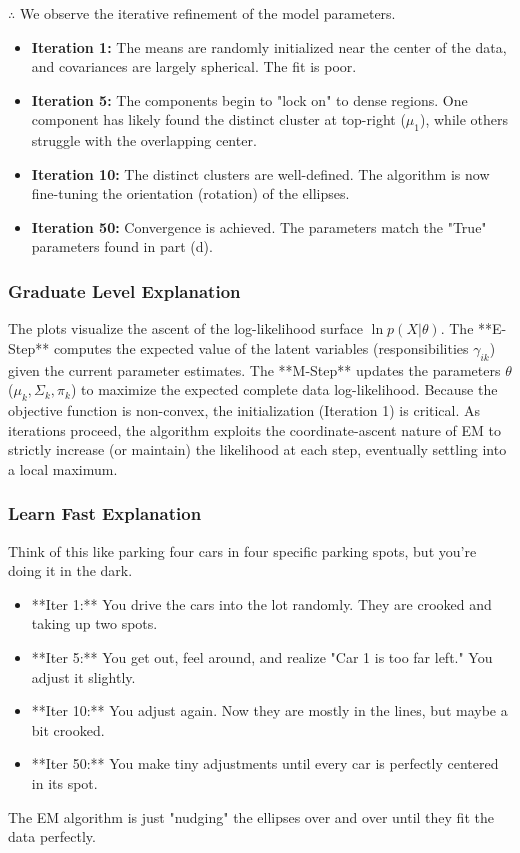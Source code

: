 \documentclass{article}
\begin{document}
\subsubsection*{\normalfont}{$\therefore$ }
We observe the iterative refinement of the model parameters.
\begin{itemize}
    \item \textbf{Iteration 1:} The means are randomly initialized near the center of the data, and covariances are largely spherical. The fit is poor.
    \item \textbf{Iteration 5:} The components begin to "lock on" to dense regions. One component has likely found the distinct cluster at top-right ($\mu_1$), while others struggle with the overlapping center.
    \item \textbf{Iteration 10:} The distinct clusters are well-defined. The algorithm is now fine-tuning the orientation (rotation) of the ellipses.
    \item \textbf{Iteration 50:} Convergence is achieved. The parameters match the "True" parameters found in part (d).
\end{itemize}

\subsubsection*{Graduate Level Explanation}

The plots visualize the ascent of the log-likelihood surface $\ln p(X|\theta)$. 
The **E-Step** computes the expected value of the latent variables (responsibilities $\gamma_{ik}$) given the current parameter estimates.
The **M-Step** updates the parameters $\theta$ ($\mu_k, \Sigma_k, \pi_k$) to maximize the expected complete data log-likelihood.
Because the objective function is non-convex, the initialization (Iteration 1) is critical. As iterations proceed, the algorithm exploits the coordinate-ascent nature of EM to strictly increase (or maintain) the likelihood at each step, eventually settling into a local maximum.

\subsubsection*{Learn Fast Explanation}
Think of this like parking four cars in four specific parking spots, but you're doing it in the dark.
\begin{itemize}
    \item **Iter 1:** You drive the cars into the lot randomly. They are crooked and taking up two spots.
    \item **Iter 5:** You get out, feel around, and realize "Car 1 is too far left." You adjust it slightly.
    \item **Iter 10:** You adjust again. Now they are mostly in the lines, but maybe a bit crooked.
    \item **Iter 50:** You make tiny adjustments until every car is perfectly centered in its spot.
\end{itemize}
The EM algorithm is just "nudging" the ellipses over and over until they fit the data perfectly.
\end{document}
